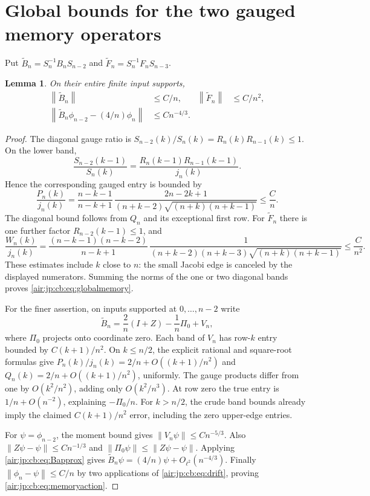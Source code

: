 \documentclass[11pt,letterpaper]{article}
\numberwithin{equation}{section}
\newtheorem{lemma}[theorem]{Lemma}
\theoremstyle{remark}
\newcommand{\norm}[1]{\left\lVert#1\right\rVert}
\begin{document}
\section{Global bounds for the two gauged memory operators}\label{air:jp:cb:sec:gauged}
Put $\widetilde B_n=S_n^{-1}B_nS_{n-2}$ and $\widetilde F_n=S_n^{-1}F_nS_{n-3}$.
\begin{lemma}\label{air:jp:cb:lem:memorybounds}
On their entire finite input supports,
\begin{align}
 \norm{\widetilde B_n}&\le C/n,&\norm{\widetilde F_n}&\le C/n^2,\label{air:jp:cb:eq:globalmemory}\\
 \norm{\widetilde B_n\phi_{n-2}-(4/n)\phi_n}&\le Cn^{-4/3}.\label{air:jp:cb:eq:memoryaction}
\end{align}
\end{lemma}
\begin{proof}
The diagonal gauge ratio is $S_{n-2}(k)/S_n(k)=R_n(k)R_{n-1}(k)\le1$. On the lower band,
\[
 \frac{S_{n-2}(k-1)}{S_n(k)}=\frac{R_n(k-1)R_{n-1}(k-1)}{j_n(k)}.
\]
Hence the corresponding gauged entry is bounded by
\[
 \frac{P_n(k)}{j_n(k)}=
 \frac{n-k-1}{n-k+1}\,
 \frac{2n-2k+1}{(n+k-2)\sqrt{(n+k)(n+k-1)}}\le\frac Cn.
\]
The diagonal bound follows from $Q_n$ and its exceptional first row. For $\widetilde F_n$ there is one further factor $R_{n-2}(k-1)\le1$, and
\[
 \frac{W_n(k)}{j_n(k)}=
 \frac{(n-k-1)(n-k-2)}{n-k+1}\,
 \frac1{(n+k-2)(n+k-3)\sqrt{(n+k)(n+k-1)}}\le\frac C{n^2}.
\]
These estimates include $k$ close to $n$: the small Jacobi edge is canceled by the displayed numerators. Summing the norms of the one or two diagonal bands proves \eqref{air:jp:cb:eq:globalmemory}.

For the finer assertion, on inputs supported at $0,\ldots,n-2$ write
\begin{equation}\label{air:jp:cb:eq:Bapprox}
 \widetilde B_n=\frac2n(I+Z)-\frac1n\Pi_0+V_n,
\end{equation}
where $\Pi_0$ projects onto coordinate zero. Each band of $V_n$ has row-$k$ entry bounded by $C(k+1)/n^2$. On $k\le n/2$, the explicit rational and square-root formulas give
$P_n(k)/j_n(k)=2/n+O((k+1)/n^2)$ and $Q_n(k)=2/n+O((k+1)/n^2)$, uniformly. The gauge products differ from one by $O(k^2/n^2)$, adding only $O(k^2/n^3)$. At row zero the true entry is $1/n+O(n^{-2})$, explaining $-\Pi_0/n$. For $k>n/2$, the crude band bounds already imply the claimed $C(k+1)/n^2$ error, including the zero upper-edge entries.

For $\psi=\phi_{n-2}$, the moment bound gives $\norm{V_n\psi}\le Cn^{-5/3}$. Also $\norm{Z\psi-\psi}\le Cn^{-1/3}$ and $\norm{\Pi_0\psi}\le\norm{Z\psi-\psi}$. Applying \eqref{air:jp:cb:eq:Bapprox} gives $\widetilde B_n\psi=(4/n)\psi+O_{\ell^2}(n^{-4/3})$. Finally $\norm{\phi_n-\psi}\le C/n$ by two applications of \eqref{air:jp:cb:eq:drift}, proving \eqref{air:jp:cb:eq:memoryaction}.
\end{proof}
\end{document}
